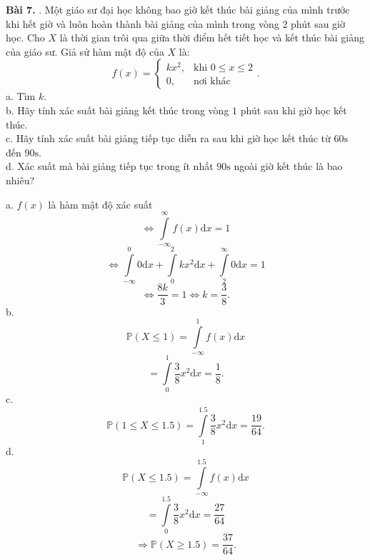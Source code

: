 \documentclass[12pt,a4paper]{article}
\begin{document}
\begin{mybox}
    \textbf{Bài 7.} .  Một giáo sư đại học không bao giờ kết thúc bài giảng của mình trước khi hết giờ và luôn  hoàn  
    thành  bài  giảng  của  mình  trong  vòng  $2$  phút  sau  giờ  học.  Cho  $X$  là  thời gian trôi qua 
    giữa thời điểm hết tiết học và kết thúc bài giảng của giáo sư. Giả sử hàm mật độ của $X$  là:
    $$f \left( x \right) = 
    \begin{cases}
        kx^2,&\text{khi } 0 \leqslant x \leqslant 2\\
        0,&\text{nơi khác}
    \end{cases}
    .$$
    a. Tìm $k.$\\
    b. Hãy tính xác suất bài giảng kết thúc trong vòng $1$ phút sau khi giờ học kết thúc.\\
    c. Hãy tính xác suất bài giảng tiếp tục diễn ra sau khi giờ học kết thúc từ $60 \mathrm{s}$ đến $90 \mathrm{s}.$\\
    d. Xác suất mà bài giảng tiếp tục trong ít nhất $90 \mathrm{s}$ ngoài giờ kết thúc là bao nhiêu?
\end{mybox}
a. $f \left( x \right)$ là hàm mật độ xác suất
$$ \Leftrightarrow \int\limits_{ - \infty }^\infty  {f\left( x \right)\mathrm{d}x} = 1 $$
$$ \Leftrightarrow \int\limits_{ - \infty }^0 {0\mathrm{d}x}  + \int\limits_0^2 {k{x^2}\mathrm{d}x}  + \int\limits_2^\infty  {0\mathrm{d}x}  = 1$$
$$ \Leftrightarrow \frac{{8k}}{3} = 1 \Leftrightarrow k = \frac{3}{8}.$$
b. $$\mathbb{P} \left( { X \leqslant 1 }\right) = \int\limits_{- \infty}^1 {f\left( x \right)\mathrm{d}x}$$
$$ = \int\limits_{0}^1 {\frac{3}{8} x^2 \mathrm{d}x} = \frac{1}{8}.$$
c. $$\mathbb{P} \left( {1 \leqslant X \leqslant 1.5 }\right) = \int\limits_{1}^{1.5} {\frac{3}{8} x^2 \mathrm{d}x} = \frac{19}{64}.$$
d. $$\mathbb{P} \left( { X \leqslant 1.5 }\right) = \int\limits_{- \infty}^{1.5} {f\left( x \right)\mathrm{d}x}$$
$$ = \int\limits_{0}^{1.5} {\frac{3}{8} x^2 \mathrm{d}x} = \frac{27}{64}$$
$$\Rightarrow \mathbb{P} \left( { X \geqslant 1.5 }\right) = \frac{37}{64}.$$
\end{document}
